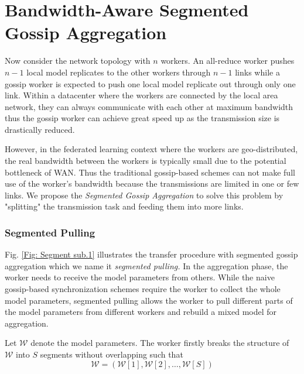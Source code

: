 \section{Bandwidth-Aware Segmented Gossip Aggregation}

Now consider the network topology with $n$ workers. An all-reduce worker pushes $n-1$ local model replicates to the other workers through $n-1$ links while a gossip worker is expected to push one local model replicate out through only one link. Within a datacenter where the workers are connected by the local area network, they can always communicate with each other at maximum bandwidth thus the gossip worker can achieve great speed up as the transmission size is drastically reduced.

However, in the federated learning context where the workers are geo-distributed, the real bandwidth between the workers is typically small due to the potential bottleneck of WAN. Thus the traditional gossip-based schemes can not make full use of the worker's bandwidth because the transmissions are limited in one or few links. We propose the \emph{Segmented Gossip Aggregation} to solve this problem by "splitting" the transmission task and feeding them into more links.

%

\subsubsection{Segmented Pulling}

Fig. \ref{Fig: Segment sub.1} illustrates the transfer procedure with segmented gossip aggregation which we name it \emph{segmented pulling.} In the aggregation phase, the worker needs to receive the model parameters from others. While the naive gossip-based synchronization schemes require the worker to collect the whole model parameters, segmented pulling allows the worker to pull different parts of the model parameters from different workers and rebuild a mixed model for aggregation.

Let $\mathcal{W}$ denote the model parameters. The worker firstly breaks the structure of $\mathcal{W}$ into $S$ segments without overlapping such that
\begin{equation}
    \mathcal{W} = (\mathcal{W}[1],\mathcal{W}[2],\dots,\mathcal{W}[S])
\end{equation}


